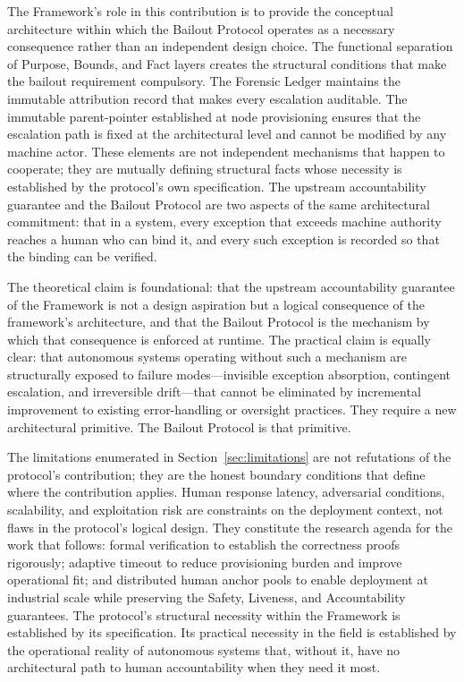 The \bxthree{} Framework's role in this contribution is to provide the conceptual architecture within which the Bailout Protocol operates as a necessary consequence rather than an independent design choice. The functional separation of Purpose, Bounds, and Fact layers creates the structural conditions that make the bailout requirement compulsory. The Forensic Ledger maintains the immutable attribution record that makes every escalation auditable. The immutable parent-pointer established at node provisioning ensures that the escalation path is fixed at the architectural level and cannot be modified by any machine actor. These elements are not independent mechanisms that happen to cooperate; they are mutually defining structural facts whose necessity is established by the protocol's own specification. The upstream accountability guarantee and the Bailout Protocol are two aspects of the same architectural commitment: that in a \bxthree{} system, every exception that exceeds machine authority reaches a human who can bind it, and every such exception is recorded so that the binding can be verified.

The theoretical claim is foundational: that the upstream accountability guarantee of the \bxthree{} Framework is not a design aspiration but a logical consequence of the framework's architecture, and that the Bailout Protocol is the mechanism by which that consequence is enforced at runtime. The practical claim is equally clear: that autonomous systems operating without such a mechanism are structurally exposed to failure modes---invisible exception absorption, contingent escalation, and irreversible drift---that cannot be eliminated by incremental improvement to existing error-handling or oversight practices. They require a new architectural primitive. The Bailout Protocol is that primitive.

The limitations enumerated in Section~\ref{sec:limitations} are not refutations of the protocol's contribution; they are the honest boundary conditions that define where the contribution applies. Human response latency, adversarial conditions, scalability, and exploitation risk are constraints on the deployment context, not flaws in the protocol's logical design. They constitute the research agenda for the work that follows: formal verification to establish the correctness proofs rigorously; adaptive timeout to reduce provisioning burden and improve operational fit; and distributed human anchor pools to enable deployment at industrial scale while preserving the Safety, Liveness, and Accountability guarantees. The protocol's structural necessity within the \bxthree{} Framework is established by its specification. Its practical necessity in the field is established by the operational reality of autonomous systems that, without it, have no architectural path to human accountability when they need it most.

